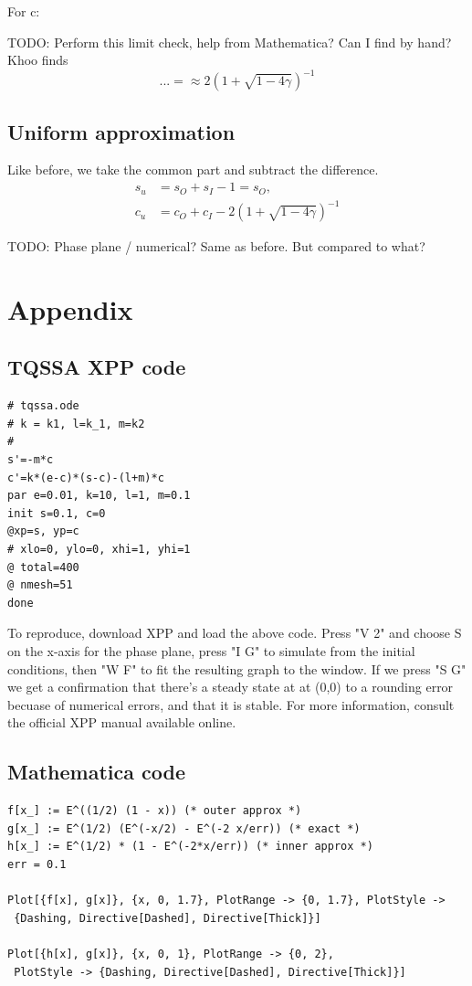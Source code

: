 \documentclass[12pt]{article}
\begin{document}
For c:

TODO: Perform this limit check, help from Mathematica? Can I find by hand? Khoo
finds
\begin{equation}
... = \approx 2(1+\sqrt{1-4\gamma})^{-1}
\end{equation}

\subsection{Uniform approximation}

Like before, we take the common part and subtract the difference.
\begin{align}
s_u &= s_O + s_I - 1 = s_O, \\
c_u &= c_O + c_I - 2(1 + \sqrt{1-4\gamma})^{-1}
\end{align}

TODO: Phase plane / numerical? Same as before. But compared to what?

\section{Appendix}

\subsection{TQSSA XPP code}
\begin{verbatim}
# tqssa.ode
# k = k1, l=k_1, m=k2
#
s'=-m*c
c'=k*(e-c)*(s-c)-(l+m)*c
par e=0.01, k=10, l=1, m=0.1
init s=0.1, c=0
@xp=s, yp=c
# xlo=0, ylo=0, xhi=1, yhi=1
@ total=400
@ nmesh=51
done
\end{verbatim}

To reproduce, download XPP and load the above code. Press "V 2" and
choose S on the x-axis for the phase plane, press "I G" to simulate
from the initial conditions, then "W F" to fit the resulting graph to
the window. If we press "S G" we get a confirmation that there's a
steady state at at (0,0) to a rounding error becuase of numerical
errors, and that it is stable. For more information, consult the
official XPP manual available online.

\subsection{Mathematica code}
\begin{verbatim}
f[x_] := E^((1/2) (1 - x)) (* outer approx *)
g[x_] := E^(1/2) (E^(-x/2) - E^(-2 x/err)) (* exact *)
h[x_] := E^(1/2) * (1 - E^(-2*x/err)) (* inner approx *)
err = 0.1

Plot[{f[x], g[x]}, {x, 0, 1.7}, PlotRange -> {0, 1.7}, PlotStyle ->
 {Dashing, Directive[Dashed], Directive[Thick]}]

Plot[{h[x], g[x]}, {x, 0, 1}, PlotRange -> {0, 2}, 
 PlotStyle -> {Dashing, Directive[Dashed], Directive[Thick]}]
\end{verbatim}


\end{document}
